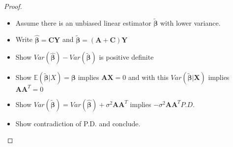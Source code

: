 \documentclass[12pt]{article}  %
\newcommand{\E}{{\mathbb{E}}}
\newcommand{\bb}{{\boldsymbol{\beta}}}
\begin{document}
\begin{proof}
\begin{itemize}
\item Assume there is an unbiased linear estimator $\widetilde{\bb}$ with lower variance.
\item Write $\widehat{\bb} = \mathbf{CY}$ and $\widetilde{\bb} = \mathbf{(A+C)Y}$
\item Show $Var(\widehat{\bb}) - Var(\widetilde{\bb})$ is positive definite
\item Show $\E(\widetilde{\bb}|X) = \bb$ implies $\mathbf{AX} = 0$ and with this $Var(\widetilde{\bb}|\mathbf{X})$ implies $\mathbf{AA}^{T} = 0$
\item Show $Var(\widetilde{\bb}) = Var(\widehat{\bb}) + \sigma^2\mathbf{AA}^{T}$ implies $-\sigma^2\mathbf{AA}^{T} P.D.$ 
\item Show contradiction of P.D. and conclude. 
\end{itemize}


\end{proof}
\end{document}

